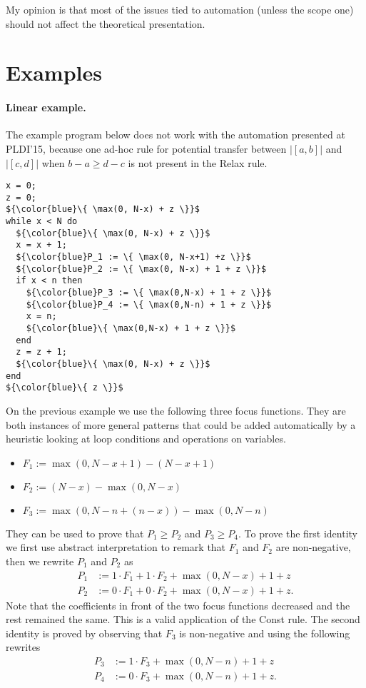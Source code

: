 \documentclass[nocopyrightspace,preprint]{sigplanconf-pldi15}
\begin{document}
My opinion is that most of the issues tied to automation (unless
the scope one) should not affect the theoretical presentation.

\section{Examples}

\paragraph{Linear example.}  The example program below does not
work with the automation presented at PLDI'15, because one ad-hoc
rule for potential transfer between $|[a,b]|$ and $|[c,d]|$ when
$b-a \ge d-c$ is not present in the {\sc Relax} rule.

\begin{lstlisting}[mathescape]
x = 0;
z = 0;
${\color{blue}\{ \max(0, N-x) + z \}}$
while x < N do
  ${\color{blue}\{ \max(0, N-x) + z \}}$
  x = x + 1;
  ${\color{blue}P_1 := \{ \max(0, N-x+1) +z \}}$
  ${\color{blue}P_2 := \{ \max(0, N-x) + 1 + z \}}$
  if x < n then
    ${\color{blue}P_3 := \{ \max(0,N-x) + 1 + z \}}$
    ${\color{blue}P_4 := \{ \max(0,N-n) + 1 + z \}}$
    x = n;
    ${\color{blue}\{ \max(0,N-x) + 1 + z \}}$
  end
  z = z + 1;
  ${\color{blue}\{ \max(0, N-x) + z \}}$
end
${\color{blue}\{ z \}}$
\end{lstlisting}
%
On the previous example we use the following three focus
functions.  They are both instances of more general patterns
that could be added automatically by a heuristic looking at
loop conditions and operations on variables.
\begin{itemize}
\item $F_1 := \max(0, N-x+1) - (N-x+1)$
\item $F_2 := (N-x) - \max(0, N-x)$
\item $F_3 := \max(0, N-n + (n-x)) - \max(0,N-n)$
\end{itemize}

They can be used to prove that $P_1 \ge P_2$ and $P_3 \ge P_4$.
To prove the first identity we first use abstract interpretation
to remark that $F_1$ and $F_2$ are non-negative, then we
rewrite $P_1$ and $P_2$ as
\begin{align*}
P_1 &:= 1 \cdot F_1 + 1 \cdot F_2 + \max(0, N-x) + 1 + z \\
P_2 &:= 0 \cdot F_1 + 0 \cdot F_2 + \max(0, N-x) + 1 + z.
\end{align*}
Note that the coefficients in front of the two focus functions
decreased and the rest remained the same.  This is a valid
application of the {\sc Const} rule.
The second identity is proved by observing that $F_3$ is
non-negative and using the following rewrites
\begin{align*}
P_3 &:= 1 \cdot F_3 + \max(0, N-n) + 1 + z \\
P_4 &:= 0 \cdot F_3 + \max(0, N-n) + 1 + z.
\end{align*}
\end{document}
